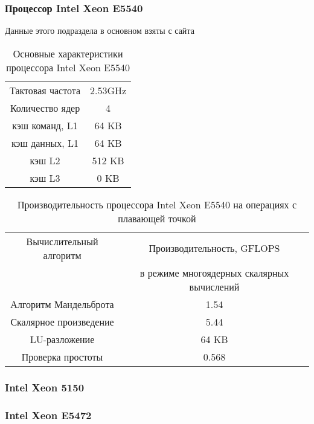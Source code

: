 \subsubsection{Процессор Intel Xeon  E5540}
Данные этого подраздела в основном взяты с сайта \cite{geek_E5540}


\begin{table}[ht]
\begin{center}
\caption{Основные характеристики процессора Intel Xeon  E5540}
\begin{tabular}{|c|c|}
\hline	
Тактовая частота & 2.53GHz   \\
Количество ядер & 4 	     \\
кэш команд, L1 &  64 KB      \\
кэш данных, L1 &  64 KB       \\
кэш L2         &  512 KB      \\
кэш L3         &  0 KB        \\
\hline                      
\end{tabular}
\end{center} 	
\end{table} 	

\begin{table}[ht]
\begin{center}
\caption{Производительность процессора Intel Xeon  E5540 на операциях с плавающей точкой}
\begin{tabular}{|c|c|}
\hline	
Вычислительный алгоритм &  Производительность, GFLOPS \\ 
                 & в режиме многоядерных скалярных вычислений \\ \hline
Алгоритм Мандельброта  &  1.54 	\\
Скалярное произведение &  5.44   \\
LU-разложение          &  64 KB   \\
Проверка простоты      & 0.568  \\ \hline

\hline
		\end{tabular}
	\end{center} 	
\end{table} 	


\subsubsection{Intel Xeon 5150}
\subsubsection{Intel Xeon E5472}
